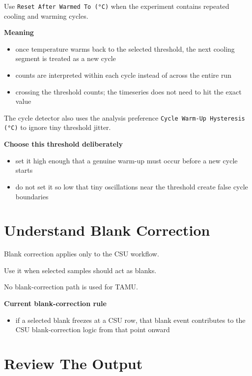 \documentclass[
  9pt,
  letterpaper,
  oneside,
  open=any,
  DIV=15,
  parskip=half-,
  headings=big,
  numbers=noenddot
]{scrbook}
\newcommand{\manuallead}[1]{%
  \vspace{0.15em}%
  {\sffamily\bfseries\color{ManualBlue}#1}\par\nobreak\vspace{0.05em}%
}
\begin{document}
Use \texttt{Reset After Warmed To (°C)} when the experiment contains repeated cooling and warming cycles.


\manuallead{Meaning}

\begin{itemize}[leftmargin=*,itemsep=0.35em,topsep=0.4em]
\item once temperature warms back to the selected threshold, the next cooling segment is treated as a new cycle
\item counts are interpreted within each cycle instead of across the entire run
\item crossing the threshold counts; the timeseries does not need to hit the exact value
\end{itemize}

The cycle detector also uses the analysis preference \texttt{Cycle Warm-Up Hysteresis (°C)} to ignore tiny threshold jitter.


\manuallead{Choose this threshold deliberately}

\begin{itemize}[leftmargin=*,itemsep=0.35em,topsep=0.4em]
\item set it high enough that a genuine warm-up must occur before a new cycle starts
\item do not set it so low that tiny oscillations near the threshold create false cycle boundaries
\end{itemize}

\section{Understand Blank Correction}

Blank correction applies only to the CSU workflow.


Use it when selected samples should act as blanks.


No blank-correction path is used for TAMU.


\manuallead{Current blank-correction rule}

\begin{itemize}[leftmargin=*,itemsep=0.35em,topsep=0.4em]
\item if a selected blank freezes at a CSU row, that blank event contributes to the CSU blank-correction logic from that point onward
\end{itemize}

\section{Review The Output}
\end{document}
